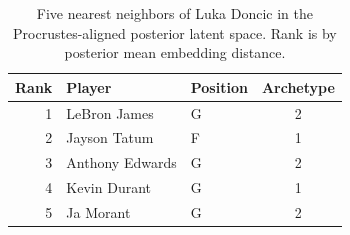 \begin{table}[htbp]
  \centering\small
  \begin{tabular}{rllc}
    \toprule
    Rank & Player & Position & Archetype \\
    \midrule
    1 & LeBron James & G & 2 \\
    2 & Jayson Tatum & F & 1 \\
    3 & Anthony Edwards & G & 2 \\
    4 & Kevin Durant & G & 1 \\
    5 & Ja Morant & G & 2 \\
    \bottomrule
  \end{tabular}
  \caption{Five nearest neighbors of Luka Doncic in the Procrustes-aligned posterior latent space. Rank is by posterior mean embedding distance.}
  \label{tab:Luka_Doncic_neighbors}
\end{table}


